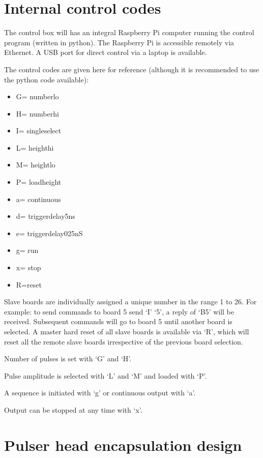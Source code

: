 
%
%
\section{Internal control codes}
The control box will has an integral Raspberry Pi computer running the control program (written in python). The Raspberry Pi is accessible remotely via Ethernet. A USB port for direct control via a laptop is available.

The control codes are given here for reference (although it is recommended to use the python code available):
\begin{itemize}
\item	G= numberlo		
\item H= numberhi
\item I= singleselect
\item L= heighthi
\item M= heightlo
\item P= loadheight
\item a= continuous
\item d= triggerdelay5ns
\item e= triggerdelay025nS
\item g= run
\item x= stop
\item R=reset
\end{itemize}

Slave boards are individually assigned a unique number in the range 1 to 26. For example: to send commands to board 5 send ‘I’ ‘5’, a reply of ‘B5’ will be received. Subsequent commands will go to board 5 until another board is selected. A master hard reset of all slave boards is available via ‘R’, which will reset all the remote slave boards irrespective of the previous board selection.

Number of pulses is set with ‘G’ and ‘H’.

Pulse amplitude is selected with ‘L’ and  ‘M’ and loaded with ‘P’.

A sequence is initiated with ‘g’ or  continuous output with ‘a’.               

Output can be stopped at any time with ‘x’.
%
%
\section{Pulser head encapsulation design}
\vspace{-2cm}



